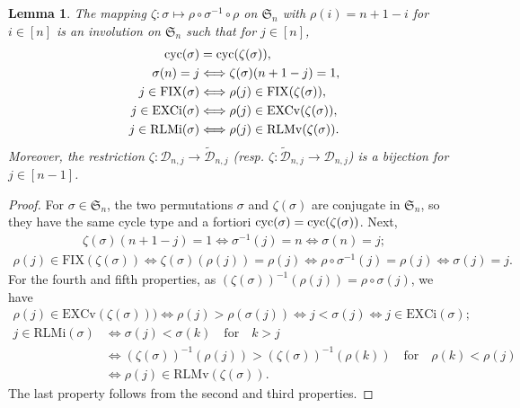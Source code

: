 \documentclass[12pt,reqno]{amsart}
\numberwithin{equation}{section}
\newcommand\cyc{\mathop{ \rm cyc}}
\def\D{\mathcal{D}}
\def\S{\mathfrak{ S}}
\def\cyc{\mathop{\rm cyc}}
\newtheorem{lem}{Lemma}
\begin{document}
\begin{lem}\label{lem:key} The mapping 
$\zeta: \sigma\mapsto \rho\circ\sigma^{-1}\circ\rho$ on $\S_n$ with 
$\rho(i)=n+1-i$  for 
$i\in [n]$ is an involution on $\S_n$ such   that for $j\in [n]$,
\begin{align*}
\cyc(\sigma)&=\cyc(\zeta(\sigma)),\\
\sigma(n)=j&\Longleftrightarrow\zeta(\sigma)(n+1-j)=1,\\
j\in \mathrm{FIX}(\sigma)&\Longleftrightarrow \rho(j)\in \mathrm{FIX}(\zeta(\sigma)),\\
j\in \mathrm{EXCi}(\sigma)&\Longleftrightarrow \rho(j)\in \mathrm{EXCv}(\zeta(\sigma)),\\
j\in \mathrm{RLMi}(\sigma)&\Longleftrightarrow \rho(j)\in \mathrm{RLMv}(\zeta(\sigma)).
\end{align*}
Moreover,  
the restriction $\zeta:\D_{n, j}\to \widetilde{\D}_{n,j}$ 
(resp. $\zeta:\widetilde{\D}_{n,j}\to \D_{n, j}$)  is a bijection  for $j\in [n-1]$.  
\end{lem}
\begin{proof}
 For $\sigma\in \S_n$,   the two
permutations $\sigma$ and $\zeta(\sigma)$ are  conjugate  in $\S_n$,  so  they have the same cycle type and a fortiori  $\cyc(\sigma)=\cyc(\zeta(\sigma))$. Next, 
\begin{align*}
\zeta(\sigma)(n+1-j)=1
\Longleftrightarrow \sigma^{-1}(j)=n
\Longleftrightarrow \sigma(n)=j;
\end{align*}
\begin{align*}
\rho(j)\in \mathrm{FIX}(\zeta(\sigma))\Longleftrightarrow \zeta(\sigma)(\rho(j))=\rho(j)
\Longleftrightarrow \rho\circ \sigma^{-1}(j)=\rho(j)
\Longleftrightarrow \sigma(j)=j.
\end{align*}
For the fourth and fifth properties, as $(\zeta(\sigma))^{-1}(\rho(j))=\rho\circ \sigma(j)$, we have
\begin{align*}
\rho(j)\in \mathrm{EXCv}(\zeta(\sigma)))
\Longleftrightarrow \rho(j)>\rho(\sigma(j))\Longleftrightarrow j<\sigma(j)\Longleftrightarrow
j\in \mathrm{EXCi}(\sigma);
\end{align*}
\begin{align*}
j\in \mathrm{RLMi}(\sigma)&\Longleftrightarrow
\sigma(j)<\sigma(k) \quad \textrm{for} \quad k>j\\
&\Longleftrightarrow (\zeta(\sigma))^{-1}(\rho(j))>(\zeta(\sigma))^{-1}(\rho(k))\quad \textrm{for} \quad \rho(k)<\rho(j)\\
&\Longleftrightarrow 
 \rho(j)\in \mathrm{RLMv}(\zeta(\sigma)).
\end{align*}
The last property follows from the second and third properties.
\end{proof}
\end{document}
